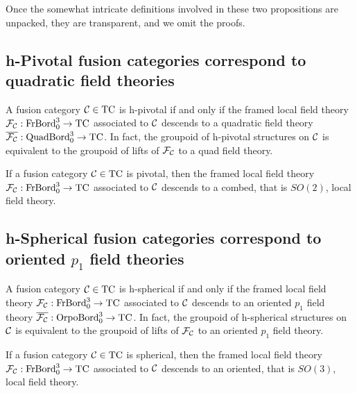\documentclass{amsart}
\begin{document}
Once the somewhat intricate definitions involved in these two propositions are unpacked, they are transparent, and we omit the proofs. 

\subsection{h-Pivotal fusion categories correspond to quadratic field theories} \label{sec-pivot-orpo}

\begin{theorem} \label{thm-hpivotal}
A fusion category $\mathcal C \in \mathrm{TC}$ is h-pivotal if and only if the framed local field theory $\mathcal F_{\mathcal C} : \mathrm{FrBord}_0^3 \rightarrow \mathrm{TC}$ associated to $\mathcal C$ descends to a quadratic field theory $\overline{\mathcal F_{\mathcal C}} : \mathrm{QuadBord}_0^3 \rightarrow \mathrm{TC}$.  In fact, the groupoid of h-pivotal structures on $\mathcal C$ is equivalent to the groupoid of lifts of $\mathcal F_{\mathcal C}$ to a quad field theory.
\end{theorem}


\begin{conjecture}
If a fusion category $\mathcal C \in \mathrm{TC}$ is pivotal, then the framed local field theory $\mathcal F_{\mathcal C} : \mathrm{FrBord}_0^3 \rightarrow \mathrm{TC}$ associated to $\mathcal C$ descends to a combed, that is $SO(2)$, local field theory.
\end{conjecture}


\subsection{h-Spherical fusion categories correspond to oriented $p_1$ field theories}

\begin{theorem} \label{thm-hspherical}
A fusion category $\mathcal C \in \mathrm{TC}$ is h-spherical if and only if the framed local field theory $\mathcal F_{\mathcal C} : \mathrm{FrBord}_0^3 \rightarrow \mathrm{TC}$ associated to $\mathcal C$ descends to an oriented $p_1$ field theory $\overline{\mathcal F_{\mathcal C}} : \mathrm{OrpoBord}_0^3 \rightarrow \mathrm{TC}$.  In fact, the groupoid of h-spherical structures on $\mathcal C$ is equivalent to the groupoid of lifts of $\mathcal F_{\mathcal C}$ to an oriented $p_1$ field theory.
\end{theorem}

\begin{conjecture}
If a fusion category $\mathcal C \in \mathrm{TC}$ is spherical, then the framed local field theory $\mathcal F_{\mathcal C} : \mathrm{FrBord}_0^3 \rightarrow \mathrm{TC}$ associated to $\mathcal C$ descends to an oriented, that is $SO(3)$, local field theory.
\end{conjecture}
\end{document}
